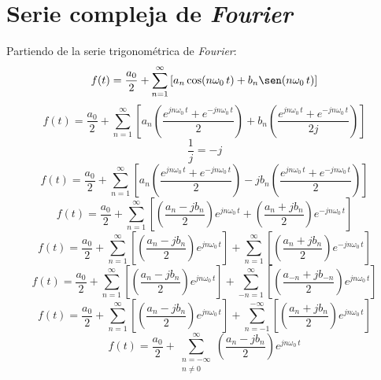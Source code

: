 \section{Serie compleja de \emph{Fourier}}
Partiendo de la serie trigonométrica de \emph{Fourier}:
\begin{equation*}
    f(t)=\frac{a_0}{2}+
    \sum_{n=1}^{\infty}\left[
        a_n\cos(n\omega_0\,t)+
        b_n\sen(n\omega_0\,t)
    \right]
\end{equation*}
\begin{equation*}
    f(t)=\frac{a_0}{2}+
    \sum_{n=1}^{\infty}\left[
        a_n\left(
            \frac{e^{jn\omega_0\,t}+e^{-jn\omega_0\,t}
            }{2}
        \right)+
        b_n\left(
            \frac{e^{jn\omega_0\,t}+e^{-jn\omega_0\,t}
            }{2j}
        \right)
    \right]
\end{equation*}
\begin{equation*}
    \frac{1}{j}=-j
\end{equation*}
\begin{equation*}
    f(t)=\frac{a_0}{2}+
    \sum_{n=1}^{\infty}\left[
        a_n\left(
            \frac{e^{jn\omega_0\,t}+e^{-jn\omega_0\,t}
            }{2}
        \right)-
        jb_n\left(
            \frac{e^{jn\omega_0\,t}+e^{-jn\omega_0\,t}
            }{2}
        \right)
    \right]
\end{equation*}
\begin{equation*}
    f(t)=\frac{a_0}{2}+
    \sum_{n=1}^{\infty}\left[
        \left(\frac{a_n-jb_n}{2}\right)e^{jn\omega_0\,t}+
        \left(\frac{a_n+jb_n}{2}\right)e^{-jn\omega_0\,t}
    \right]
\end{equation*}
\begin{equation*}
    f(t)=\frac{a_0}{2}+
    \sum_{n=1}^{\infty}\left[
        \left(\frac{a_n-jb_n}{2}\right)e^{jn\omega_0\,t}
    \right]+
    \sum_{n=1}^{\infty}\left[
        \left(\frac{a_n+jb_n}{2}\right)e^{-jn\omega_0\,t}
    \right]
\end{equation*}
\begin{equation*}
    f(t)=\frac{a_0}{2}+
    \sum_{n=1}^{\infty}\left[
        \left(\frac{a_n-jb_n}{2}\right)e^{jn\omega_0\,t}
    \right]+
    \sum_{-n=1}^{\infty}\left[
        \left(\frac{a_{-n}+jb_{-n}}{2}\right)e^{jn\omega_0\,t}
    \right]
\end{equation*}
\begin{equation*}
    f(t)=\frac{a_0}{2}+
    \sum_{n=1}^{\infty}\left[
        \left(\frac{a_n-jb_n}{2}\right)e^{jn\omega_0\,t}
    \right]+
    \sum_{n=-1}^{-\infty}\left[
        \left(\frac{a_n+jb_n}{2}\right)e^{jn\omega_0\,t}
    \right]
\end{equation*}
\begin{equation*}
    f(t)=\frac{a_0}{2}+
    \sum_{\substack{n=-\infty\\n\neq0}}^{\infty}
        \left(\frac{a_n-jb_n}{2}\right)e^{jn\omega_0\,t}
\end{equation*}

